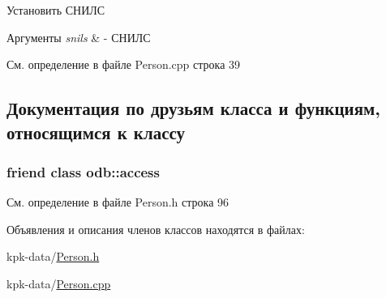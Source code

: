 Установить СНИЛС 


\begin{DoxyParams}{Аргументы}
{\em snils} & -\/ СНИЛС \\
\hline
\end{DoxyParams}


См. определение в файле Person.\+cpp строка 39



\subsection{Документация по друзьям класса и функциям, относящимся к классу}
\subsubsection[{\texorpdfstring{odb\+::access}{odb::access}}]{\setlength{\rightskip}{0pt plus 5cm}friend class odb\+::access\hspace{0.3cm}{\ttfamily [friend]}}\hypertarget{classkpk_1_1data_1_1_person_acb4d953abf85ae525f1d06a0c3a86a55}{}\label{classkpk_1_1data_1_1_person_acb4d953abf85ae525f1d06a0c3a86a55}


См. определение в файле Person.\+h строка 96



Объявления и описания членов классов находятся в файлах\+:\begin{DoxyCompactItemize}
\item 
kpk-\/data/\hyperlink{_person_8h}{Person.\+h}\item 
kpk-\/data/\hyperlink{_person_8cpp}{Person.\+cpp}\end{DoxyCompactItemize}
